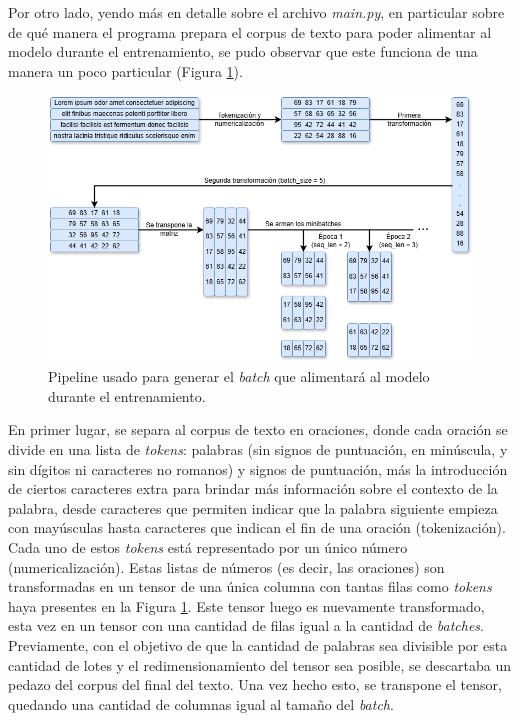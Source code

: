 Por otro lado, yendo más en detalle sobre el archivo \textit{main.py}, en particular sobre de qué manera el programa prepara el corpus de texto para poder alimentar al modelo durante el entrenamiento, se pudo observar que este funciona de una manera un poco particular (Figura \ref{fig:armado_texto}).

\begin{figure}[htb]
    \centering
    \includegraphics[width=1\textwidth]{imagenes/armado_texto.png}
    \caption{Pipeline usado para generar el \textit{batch} que alimentará al modelo durante el entrenamiento.}
    \label{fig:armado_texto}
\end{figure}

En primer lugar, se separa al corpus de texto en oraciones, donde cada oración se divide en una lista de \textit{tokens}: palabras (sin signos de puntuación, en minúscula, y sin dígitos ni caracteres no romanos) y signos de puntuación, más la introducción de ciertos caracteres extra para brindar más información sobre el contexto de la palabra, desde caracteres que permiten indicar que la palabra siguiente empieza con mayúsculas hasta caracteres que indican el fin de una oración (tokenización). Cada uno de estos \textit{tokens} está representado por un único número (numericalización). Estas listas de números (es decir, las oraciones) son transformadas en un tensor de una única columna con tantas filas como \textit{tokens} haya presentes en la Figura \ref{fig:armado_texto}. Este tensor luego es nuevamente transformado, esta vez en un tensor con una cantidad de filas igual a la cantidad de \textit{batches}. Previamente, con el objetivo de que la cantidad de palabras sea divisible por esta cantidad de lotes y el redimensionamiento del tensor sea posible, se descartaba un pedazo del corpus del final del texto. Una vez hecho esto, se transpone el tensor, quedando una cantidad de columnas igual al tamaño del \textit{batch}.

